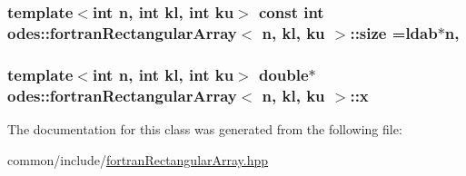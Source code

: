 \hypertarget{classodes_1_1fortranRectangularArray_a4827111315c99a9e0e80e98767fe21e3}{
\subsubsection[{size}]{\setlength{\rightskip}{0pt plus 5cm}template$<$int n, int kl, int ku$>$ const int {\bf odes\-::fortran\-Rectangular\-Array}$<$ n, kl, ku $>$\-::size ={\bf ldab}$\ast$n\hspace{0.3cm}{\ttfamily [static]}, {\ttfamily [private]}}}\label{classodes_1_1fortranRectangularArray_a4827111315c99a9e0e80e98767fe21e3}
\hypertarget{classodes_1_1fortranRectangularArray_a718a298ef74cd3ba533fc73ad739acc9}{
\subsubsection[{x}]{\setlength{\rightskip}{0pt plus 5cm}template$<$int n, int kl, int ku$>$ double$\ast$ {\bf odes\-::fortran\-Rectangular\-Array}$<$ n, kl, ku $>$\-::x\hspace{0.3cm}{\ttfamily [private]}}}\label{classodes_1_1fortranRectangularArray_a718a298ef74cd3ba533fc73ad739acc9}


The documentation for this class was generated from the following file\-:\begin{DoxyCompactItemize}
\item 
common/include/\hyperlink{fortranRectangularArray_8hpp}{fortran\-Rectangular\-Array.\-hpp}\end{DoxyCompactItemize}
